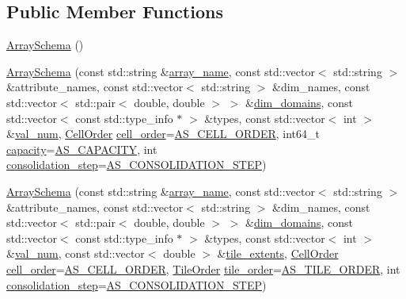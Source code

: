 \subsection*{Public Member Functions}
\begin{DoxyCompactItemize}
\item 
\hyperlink{classArraySchema_a3524f1ba69d1a84a74ed511bf4a508f0}{Array\+Schema} ()
\item 
\hyperlink{classArraySchema_a8439aeb4301eebfb73730e22386c7ce6}{Array\+Schema} (const std\+::string \&\hyperlink{classArraySchema_ae6df338bba60ba3eae504b4643607778}{array\+\_\+name}, const std\+::vector$<$ std\+::string $>$ \&attribute\+\_\+names, const std\+::vector$<$ std\+::string $>$ \&dim\+\_\+names, const std\+::vector$<$ std\+::pair$<$ double, double $>$ $>$ \&\hyperlink{classArraySchema_a7b134e05120440e3d4598884a85d92bc}{dim\+\_\+domains}, const std\+::vector$<$ const std\+::type\+\_\+info $\ast$ $>$ \&types, const std\+::vector$<$ int $>$ \&\hyperlink{classArraySchema_ad9132dbb5ad3c838df5750b3e1c71075}{val\+\_\+num}, \hyperlink{classArraySchema_a847601130253f905337b5e284e1b78f2}{Cell\+Order} \hyperlink{classArraySchema_a15bc4e7fb776028c9705f38218eac785}{cell\+\_\+order}=\hyperlink{array__schema_8h_a880783b6598264257c06471be860c6c3}{A\+S\+\_\+\+C\+E\+L\+L\+\_\+\+O\+R\+D\+E\+R}, int64\+\_\+t \hyperlink{classArraySchema_ae438b6a084ea3b363fe51d555f5af746}{capacity}=\hyperlink{array__schema_8h_a06f7786f56ef7176471c3c58c121e63b}{A\+S\+\_\+\+C\+A\+P\+A\+C\+I\+T\+Y}, int \hyperlink{classArraySchema_ac60045afe56673ac365ecb754efd042f}{consolidation\+\_\+step}=\hyperlink{array__schema_8h_a5ff39afe8e63826e6a433a2fa09f59d3}{A\+S\+\_\+\+C\+O\+N\+S\+O\+L\+I\+D\+A\+T\+I\+O\+N\+\_\+\+S\+T\+E\+P})
\item 
\hyperlink{classArraySchema_a0fec35a32290e2fdb978f0359441bb0b}{Array\+Schema} (const std\+::string \&\hyperlink{classArraySchema_ae6df338bba60ba3eae504b4643607778}{array\+\_\+name}, const std\+::vector$<$ std\+::string $>$ \&attribute\+\_\+names, const std\+::vector$<$ std\+::string $>$ \&dim\+\_\+names, const std\+::vector$<$ std\+::pair$<$ double, double $>$ $>$ \&\hyperlink{classArraySchema_a7b134e05120440e3d4598884a85d92bc}{dim\+\_\+domains}, const std\+::vector$<$ const std\+::type\+\_\+info $\ast$ $>$ \&types, const std\+::vector$<$ int $>$ \&\hyperlink{classArraySchema_ad9132dbb5ad3c838df5750b3e1c71075}{val\+\_\+num}, const std\+::vector$<$ double $>$ \&\hyperlink{classArraySchema_a8bb97e1ed6aa142aa35fa446a413d698}{tile\+\_\+extents}, \hyperlink{classArraySchema_a847601130253f905337b5e284e1b78f2}{Cell\+Order} \hyperlink{classArraySchema_a15bc4e7fb776028c9705f38218eac785}{cell\+\_\+order}=\hyperlink{array__schema_8h_a880783b6598264257c06471be860c6c3}{A\+S\+\_\+\+C\+E\+L\+L\+\_\+\+O\+R\+D\+E\+R}, \hyperlink{classArraySchema_ae9240847f83a545b7de651f032ffde63}{Tile\+Order} \hyperlink{classArraySchema_a644e0d03963cae3528456c9cfd0ad13d}{tile\+\_\+order}=\hyperlink{array__schema_8h_a24b2d047fda818f950050a82c1f73804}{A\+S\+\_\+\+T\+I\+L\+E\+\_\+\+O\+R\+D\+E\+R}, int \hyperlink{classArraySchema_ac60045afe56673ac365ecb754efd042f}{consolidation\+\_\+step}=\hyperlink{array__schema_8h_a5ff39afe8e63826e6a433a2fa09f59d3}{A\+S\+\_\+\+C\+O\+N\+S\+O\+L\+I\+D\+A\+T\+I\+O\+N\+\_\+\+S\+T\+E\+P})

\end{DoxyCompactItemize}
